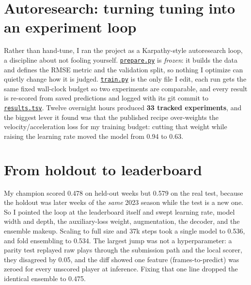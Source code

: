 \documentclass[11pt]{article}
\newcommand{\gh}[1]{\href{https://github.com/neelTheCoder/nfl-big-data-bowl-2026/blob/main/#1}{\texttt{#1}}}
\begin{document}
\section*{Autoresearch: turning tuning into an experiment loop}
Rather than hand-tune, I ran the project as a Karpathy-style autoresearch loop, a discipline about not
fooling yourself. \gh{prepare.py} is \emph{frozen}: it builds the data and defines the RMSE metric and
the validation split, so nothing I optimize can quietly change how it is judged. \gh{train.py} is the
only file I edit, each run gets the same fixed wall-clock budget so two experiments are comparable, and
every result is re-scored from saved predictions and logged with its git commit to \gh{results.tsv}.
Twelve overnight hours produced \textbf{33 tracked experiments}, and the biggest lever it found was
that the published recipe over-weights the velocity/acceleration loss for my training budget: cutting
that weight while raising the learning rate moved the model from 0.94 to 0.63.

\section*{From holdout to leaderboard}
My champion scored 0.478 on held-out weeks but 0.579 on the real test, because the holdout was later
weeks of the \emph{same} 2023 season while the test is a new one. So I pointed the loop at the
leaderboard itself and swept learning rate, model width and depth, the auxiliary-loss weight,
augmentation, the decoder, and the ensemble makeup. Scaling to full size and 37k steps took a single
model to 0.536, and fold ensembling to 0.534. The largest jump was not a hyperparameter: a parity test
replayed raw plays through the submission path and the local scorer, they disagreed by 0.05, and the
diff showed one feature (frames-to-predict) was zeroed for every unscored player at inference. Fixing
that one line dropped the identical ensemble to 0.475.
\end{document}
